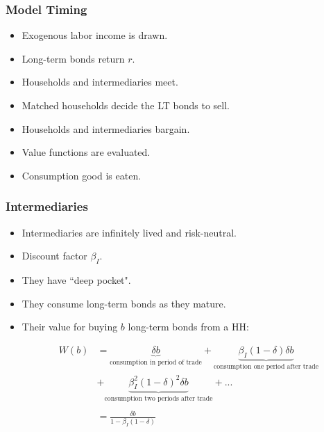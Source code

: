 \documentclass[handout]{beamer}
\begin{document}
\begin{frame}
\frametitle{Model Timing}

\begin{itemize}[<+->]

\item Exogenous labor income is drawn.
\item Long-term bonds return $r$.
\item Households and intermediaries meet.
\item Matched households decide the LT bonds to sell.
\item Households and intermediaries bargain.
\item Value functions are evaluated.
\item Consumption good is eaten.

\end{itemize}

\end{frame}





\begin{frame}
\frametitle{Intermediaries}

\begin{itemize}[<+->]

\item Intermediaries are infinitely lived and risk-neutral.
\item Discount factor $\beta_I$.
\item They have ``deep pocket".
\item They consume long-term bonds as they mature.
\item Their value for buying $b$ long-term bonds from a HH:

\begin{align*}
W(b) 
&= \underbrace{\delta b}_{\text{consumption in period of trade}} + \underbrace{\beta_I(1-\delta)\delta b}_{\text{consumption one period after trade}} \\
&+ \underbrace{\beta_I^2(1-\delta)^2\delta b}_{\text{consumption two periods after trade}} + ...\\\\
&= \frac{\delta b }{1 - \beta_I (1-\delta)}
\end{align*}

\end{itemize}

\end{frame}
\end{document}
